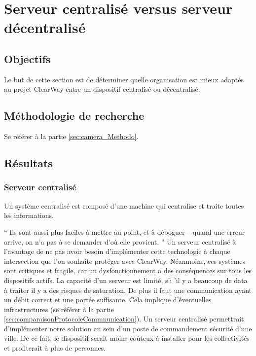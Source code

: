 
\section{Serveur centralisé versus serveur décentralisé}
\label{sec:centralise}

\subsection{Objectifs}
\label{sec:centralise_Objectifs}
Le but de cette section est de déterminer quelle organisation est mieux adaptés au projet ClearWay entre un dispositif centralisé ou décentralisé.

\subsection{Méthodologie de recherche}
\label{sec:centralise_Methodo}
Se référer à la partie \ref{sec:camera_Methodo}.

\subsection{Résultats}
\label{sec:centralise_Resultats}

\subsubsection{Serveur centralisé}
\label{sec:centralise_centralise}
Un système centralisé est composé d'une machine qui centralise et traite toutes les informations.

\enquote{
    Ils sont aussi plus faciles à mettre au point, et à déboguer – quand une erreur arrive, on n’a pas à se demander d’où elle provient. \cite{centraliser}
}
Un serveur centralisé à l'avantage de ne pas avoir besoin d'implémenter cette technologie à chaque intersection que l'on souhaite protéger avec ClearWay.
Néanmoins, ces systèmes sont critiques et fragile, car un dysfonctionnement a des conséquences sur tous les dispositifs actifs.
La capacité d'un serveur est limité, s'i 'il y a beaucoup de data à traiter il y a des risques de saturation.
De plus il faut une communication ayant un débit correct et une portée suffisante. Cela implique d'éventuelles infrastructures (se référer à la partie \ref{sec:comparaisonProtocoleCommnunication}).
Un serveur centralisé permettrait d'implémenter notre solution au sein d'un poste de commandement sécurité d'une ville. De ce fait,
le dispositif serait moins coûteux à installer pour les collectivités et profiterait à plus de personnes.

